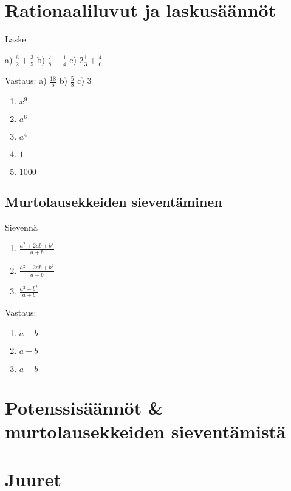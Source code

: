 \chapter{Rationaaliluvut ja laskusäännöt}

Laske %
\begin{tehtava}
a) $\frac{6}{2} + \frac{3}{5}$
b) $\frac{7}{8} - \frac{1}{4}$
c) $2 \frac{1}{3} + \frac{4}{6}$
\begin{vastaus}
Vastaus:
a) $\frac{18}{5}$
b) $\frac{5}{8}$
c) $3$
\begin{enumerate}
\item $x^9$
\item $a^6$
\item $a^4$
\item $1$
\item $1000$
\end{enumerate}
\end{vastaus}
\end{tehtava}

\section{Murtolausekkeiden sieventäminen}


\begin{tehtava}
Sievennä
\begin{enumerate}
\item $\frac{a^2+2ab+b^2}{a+b}$
\item $\frac{a^2-2ab+b^2}{a-b}$
\item $\frac{a^2-b^2}{a+b}$
\end{enumerate}
\begin{vastaus}
Vastaus:
\begin{enumerate}
\item $a-b$
\item $a+b$
\item $a-b$
\end{enumerate}
\end{vastaus}
\end{tehtava}

\chapter{Potenssisäännöt \& murtolausekkeiden sieventämistä}
\chapter{Juuret}

